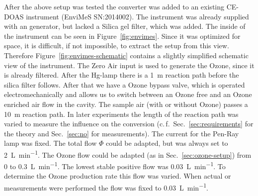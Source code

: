After the above setup was tested the converter was added to an
existing CE-DOAS instrument (EnviMeS SN:2014002). The instrument was already supplied with an 
generator, but lacked a Silica gel filter, which was added. The inside
of the instrument can be seen in Figure~\ref{fig:envimes}. Since it
was optimized for space, it is difficult, if not impossible, to extract
the setup from this view. Therefore Figure~\ref{fig:envimes-schematic}
contains a slightly simplified schematic view of the instrument. The
Zero Air input is used to
generate the Ozone, since it is already filtered. After the Hg-lamp
there is a \SI{1}{\meter} reaction path before the silica filter
follows. After that we have a Ozone bypass valve, which is operated
electromechanically and allows us to switch between an Ozone free and
an Ozone enriched air flow in the cavity. The sample air (with or
without Ozone) passes a \SI{10}{\meter} reaction path. In later
experiments the length of the reaction path was varied to measure the
influence on the  conversion (c.\,f.\
Sec.~\ref{sec:requirements} for the theory and Sec.~\ref{sec:no} for
measurements). The current for the Pen-Ray lamp was fixed. The total
flow $\Phi$ could be adapted, but was always set to
\SI{2}{\liter\per\minute}. The Ozone flow could be adapted (as in
Sec.~\ref{sec:ozone-setup}) from 0 to \SI{0.3}{\liter\per\minute}. The
lowest stable positive flow was \SI{0.03}{\liter\per\minute}. To
determine the Ozone production rate this flow was varied. When actual
\ch{NO} or \ch{NO_x}\todo{define NOx somewhere} measurements were
performed the flow was fixed to \SI{0.03}{\liter\per\minute}.

